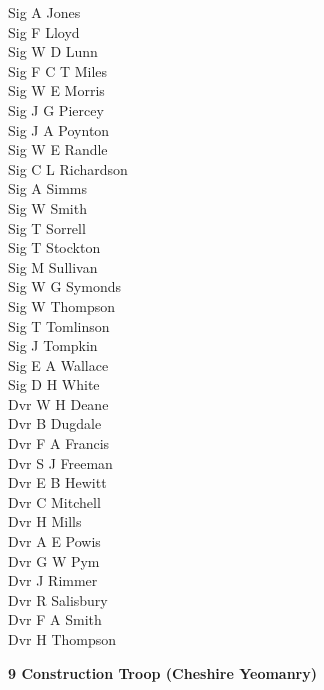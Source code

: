 \begin{multicols}{2}
  Sig A Jones \\
  Sig F Lloyd \\
  Sig W D Lunn \\
  Sig F C T Miles \\
  Sig W E Morris \\
  Sig J G Piercey \\
  Sig J A Poynton \\
  Sig W E Randle \\
  Sig C L Richardson \\
  Sig A Simms \\
  Sig W Smith \\
  Sig T Sorrell \\
  Sig T Stockton \\
  Sig M Sullivan \\
  Sig W G Symonds \\
  Sig W Thompson \\
  Sig T Tomlinson \\
  Sig J Tompkin \\
  Sig E A Wallace \\
  Sig D H White \\
  Dvr W H Deane \\
  Dvr B Dugdale \\
  Dvr F A Francis \\
  Dvr S J Freeman \\
  Dvr E B Hewitt \\
  Dvr C Mitchell \\
  Dvr H Mills \\
  Dvr A E Powis \\
  Dvr G W Pym \\
  Dvr J Rimmer \\
  Dvr R Salisbury \\
  Dvr F A Smith \\
  Dvr H Thompson \\
\end{multicols}

\begin{center}
  \Large
  \textbf{9 Construction Troop (Cheshire Yeomanry)}
\end{center}


